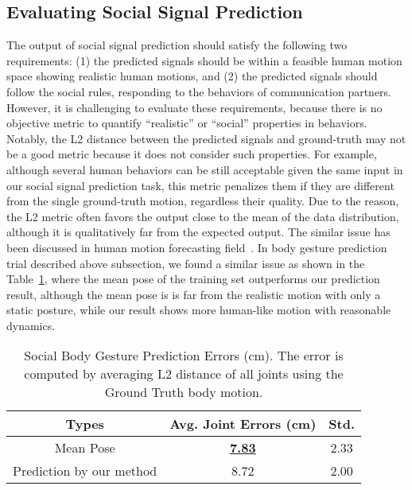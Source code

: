 \subsection{Evaluating Social Signal Prediction}
The output of social signal prediction should satisfy the following two requirements: (1) the predicted signals should be within a feasible human motion space showing realistic human motions, and (2) the predicted signals should follow the social rules, responding to the behaviors of communication partners. However, it is challenging to evaluate these requirements, because there is no objective metric to quantify ``realistic'' or ``social'' properties in behaviors. Notably, the L2 distance between the predicted signals and ground-truth may not be a good metric because it does not consider such properties. For example, although several human behaviors can be still acceptable given the same input in our social signal prediction task, this metric penalizes them if they are different from the single ground-truth motion, regardless their quality. Due to the reason, the L2 metric often favors the output close to the mean of the data distribution, although it is qualitatively far from the expected output. The similar issue has been discussed in human motion forecasting field~\cite{mnih2012conditional, Fragkiadaki_2015_ICCV, jain2016structural, zhou2018autoconditioned}. In body gesture prediction trial described above subsection, we found a similar issue as shown in the Table~\ref{table:predBody_errors}, where the mean pose of the training set outperforms our prediction result, although the mean pose is is far from the realistic motion with only a static posture, while our result shows more human-like motion with reasonable dynamics. %


\begin{table}[t]
	\centering
	\begin{tabular}{c| c| c}
		
		\hline
		Types & Avg. Joint Errors (cm) & Std.\\
		\hline
		Mean Pose & \underline {\textbf{7.83}} & 2.33\\
		\hline
		Prediction by our method & 8.72 & 2.00\\
		\hline
	\end{tabular}
	\caption{Social Body Gesture Prediction Errors (cm). The error is computed by averaging L2 distance of all joints using the Ground Truth body motion. \label{table:predBody_errors}}
\end{table}

